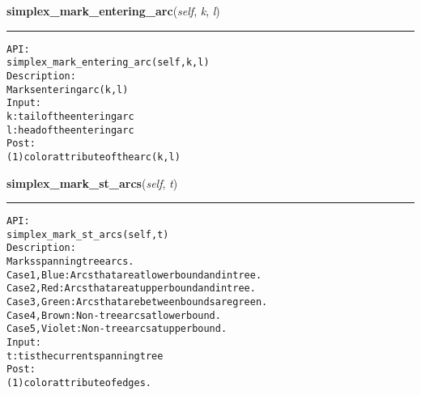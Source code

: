    \vspace{0.5ex}

\hspace{.8\funcindent}\begin{boxedminipage}{\funcwidth}

    \raggedright \textbf{simplex\_mark\_entering\_arc}(\textit{self}, \textit{k}, \textit{l})

    \vspace{-1.5ex}

    \rule{\textwidth}{0.5\fboxrule}
\setlength{\parskip}{2ex}
\begin{alltt}

API:
    simplex\_mark\_entering\_arc(self, k, l)
Description:
    Marks entering arc (k,l)
Input:
    k: tail of the entering arc
    l: head of the entering arc
Post:
    (1) color attribute of the arc (k,l)
\end{alltt}

\setlength{\parskip}{1ex}
    \end{boxedminipage}

    \label{coinor:gimpy:graph:Graph:simplex_mark_st_arcs}

    \vspace{0.5ex}

\hspace{.8\funcindent}\begin{boxedminipage}{\funcwidth}

    \raggedright \textbf{simplex\_mark\_st\_arcs}(\textit{self}, \textit{t})

    \vspace{-1.5ex}

    \rule{\textwidth}{0.5\fboxrule}
\setlength{\parskip}{2ex}
\begin{alltt}

API:
    simplex\_mark\_st\_arcs(self, t)
Description:
    Marks spanning tree arcs.
    Case 1, Blue: Arcs that are at lower bound and in tree.
    Case 2, Red: Arcs that are at upper bound and in tree.
    Case 3, Green: Arcs that are between bounds are green.
    Case 4, Brown: Non-tree arcs at lower bound.
    Case 5, Violet: Non-tree arcs at upper bound.
Input:
    t: t is the current spanning tree
Post:
    (1) color attribute of edges.
\end{alltt}

\setlength{\parskip}{1ex}
    \end{boxedminipage}

